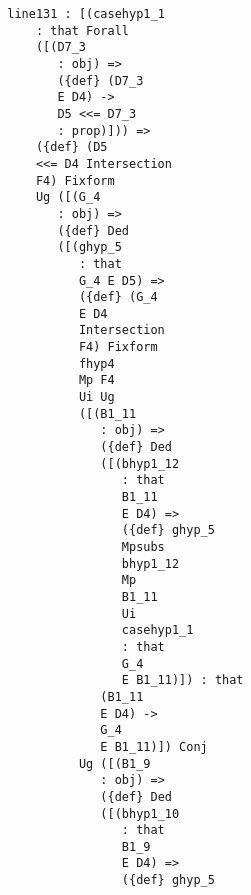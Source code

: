 \documentclass[12pt]{article}
\begin{document}
\begin{verbatim}
                           line131 : [(casehyp1_1 
                               : that Forall 
                               ([(D7_3 
                                  : obj) => 
                                  ({def} (D7_3 
                                  E D4) -> 
                                  D5 <<= D7_3 
                                  : prop)])) => 
                               ({def} (D5 
                               <<= D4 Intersection 
                               F4) Fixform 
                               Ug ([(G_4 
                                  : obj) => 
                                  ({def} Ded 
                                  ([(ghyp_5 
                                     : that 
                                     G_4 E D5) => 
                                     ({def} (G_4 
                                     E D4 
                                     Intersection 
                                     F4) Fixform 
                                     fhyp4 
                                     Mp F4 
                                     Ui Ug 
                                     ([(B1_11 
                                        : obj) => 
                                        ({def} Ded 
                                        ([(bhyp1_12 
                                           : that 
                                           B1_11 
                                           E D4) => 
                                           ({def} ghyp_5 
                                           Mpsubs 
                                           bhyp1_12 
                                           Mp 
                                           B1_11 
                                           Ui 
                                           casehyp1_1 
                                           : that 
                                           G_4 
                                           E B1_11)]) : that 
                                        (B1_11 
                                        E D4) -> 
                                        G_4 
                                        E B1_11)]) Conj 
                                     Ug ([(B1_9 
                                        : obj) => 
                                        ({def} Ded 
                                        ([(bhyp1_10 
                                           : that 
                                           B1_9 
                                           E D4) => 
                                           ({def} ghyp_5 

\end{verbatim}
\end{document}

